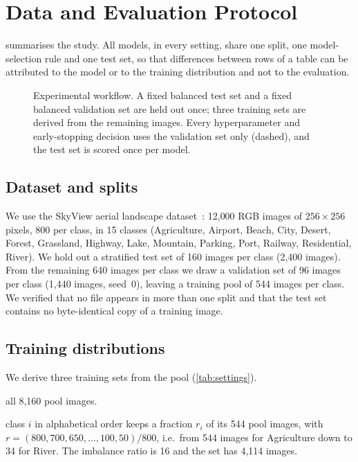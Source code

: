 \section{Data and Evaluation Protocol}
\label{sec:protocol}

 summarises the study.
All models, in every setting, share one split, one model-selection rule and one test set, so that differences between rows of a table can be attributed to the model or to the training distribution and not to the evaluation.

\begin{figure}[t]
  \centering
  \resizebox{\columnwidth}{!}{}
  \caption{Experimental workflow. A fixed balanced test set and a fixed balanced validation set are held out once; three training sets are derived from the remaining images. Every hyperparameter and early-stopping decision uses the validation set only (dashed), and the test set is scored once per model.}
  \label{fig:workflow}
\end{figure}

\subsection{Dataset and splits}
We use the SkyView aerial landscape dataset~\cite{skyview}: 12{,}000 RGB images of $256\times256$ pixels, 800 per class, in 15 classes (Agriculture, Airport, Beach, City, Desert, Forest, Grassland, Highway, Lake, Mountain, Parking, Port, Railway, Residential, River).
We hold out a stratified test set of 160 images per class (2{,}400 images).
From the remaining 640 images per class we draw a validation set of 96 images per class (1{,}440 images, seed~0), leaving a training pool of 544 images per class.
We verified that no file appears in more than one split and that the test set contains no byte-identical copy of a training image.

\subsection{Training distributions}
\label{sec:settings}
We derive three training sets from the pool (\cref{tab:settings}).

 all 8{,}160 pool images.

 class $i$ in alphabetical order keeps a fraction $r_i$ of its 544 pool images, with $r = (800, 700, 650, \ldots, 100, 50)/800$, i.e.\ from 544 images for Agriculture down to 34 for River.
The imbalance ratio is 16 and the set has 4{,}114 images.

